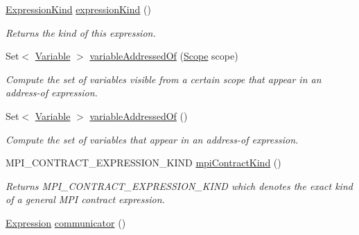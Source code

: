 \begin{DoxyCompactItemize}
\item 
\hyperlink{enumedu_1_1udel_1_1cis_1_1vsl_1_1civl_1_1model_1_1IF_1_1expression_1_1Expression_1_1ExpressionKind}{Expression\+Kind} \hyperlink{classedu_1_1udel_1_1cis_1_1vsl_1_1civl_1_1model_1_1common_1_1expression_1_1CommonMPIContractExpression_a6f9bf886eb89bb9abc95bbe6ea00cb7b}{expression\+Kind} ()
\begin{DoxyCompactList}\small\item\em Returns the kind of this expression. \end{DoxyCompactList}\item 
Set$<$ \hyperlink{interfaceedu_1_1udel_1_1cis_1_1vsl_1_1civl_1_1model_1_1IF_1_1variable_1_1Variable}{Variable} $>$ \hyperlink{classedu_1_1udel_1_1cis_1_1vsl_1_1civl_1_1model_1_1common_1_1expression_1_1CommonMPIContractExpression_acd022b3a1e77f2fa7c9a3b1c11aef1d4}{variable\+Addressed\+Of} (\hyperlink{interfaceedu_1_1udel_1_1cis_1_1vsl_1_1civl_1_1model_1_1IF_1_1Scope}{Scope} scope)
\begin{DoxyCompactList}\small\item\em Compute the set of variables visible from a certain scope that appear in an address-\/of expression. \end{DoxyCompactList}\item 
Set$<$ \hyperlink{interfaceedu_1_1udel_1_1cis_1_1vsl_1_1civl_1_1model_1_1IF_1_1variable_1_1Variable}{Variable} $>$ \hyperlink{classedu_1_1udel_1_1cis_1_1vsl_1_1civl_1_1model_1_1common_1_1expression_1_1CommonMPIContractExpression_ab28bf7de539ca80b24328c66ab36c634}{variable\+Addressed\+Of} ()
\begin{DoxyCompactList}\small\item\em Compute the set of variables that appear in an address-\/of expression. \end{DoxyCompactList}\item 
M\+P\+I\+\_\+\+C\+O\+N\+T\+R\+A\+C\+T\+\_\+\+E\+X\+P\+R\+E\+S\+S\+I\+O\+N\+\_\+\+K\+I\+N\+D \hyperlink{classedu_1_1udel_1_1cis_1_1vsl_1_1civl_1_1model_1_1common_1_1expression_1_1CommonMPIContractExpression_a4f2d856889c9ced9a515f204eecb8e5d}{mpi\+Contract\+Kind} ()
\begin{DoxyCompactList}\small\item\em Returns M\+P\+I\+\_\+\+C\+O\+N\+T\+R\+A\+C\+T\+\_\+\+E\+X\+P\+R\+E\+S\+S\+I\+O\+N\+\_\+\+K\+I\+N\+D which denotes the exact kind of a general M\+P\+I contract expression. \end{DoxyCompactList}\item 
\hyperlink{interfaceedu_1_1udel_1_1cis_1_1vsl_1_1civl_1_1model_1_1IF_1_1expression_1_1Expression}{Expression} \hyperlink{classedu_1_1udel_1_1cis_1_1vsl_1_1civl_1_1model_1_1common_1_1expression_1_1CommonMPIContractExpression_a0a85d309f74fc772989cdc1ee89e89d4}{communicator} ()

\end{DoxyCompactItemize}
